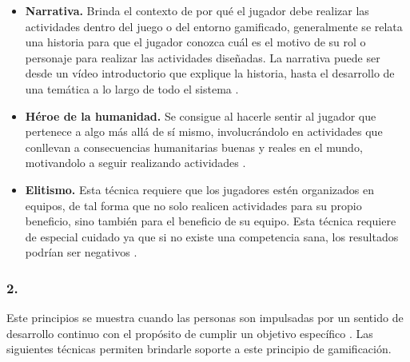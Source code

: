     \begin{itemize}
    \item
    {\bf Narrativa.}
        Brinda el contexto de por qué el jugador debe realizar las actividades dentro del juego o
        del entorno gamificado, generalmente se relata una historia para que el jugador conozca
        cuál es el motivo de su rol o personaje para realizar las actividades diseñadas.
        La narrativa puede ser desde un vídeo introductorio que explique la historia, hasta
        el desarrollo de una temática a lo largo de todo el sistema \cite[p. 81]{Octalysis}.

    \item
    {\bf Héroe de la humanidad.}
        Se consigue al hacerle sentir al jugador que pertenece a algo más allá de sí mismo,
        involucrándolo en actividades que conllevan a consecuencias humanitarias buenas y reales
        en el mundo, motivandolo a seguir realizando actividades \cite[p. 82]{Octalysis}.

    \item
    {\bf Elitismo.}
        Esta técnica requiere que los jugadores estén organizados en equipos, de tal forma que
        no solo realicen actividades para su propio beneficio, sino también para el beneficio
        de su equipo. Esta técnica requiere de especial cuidado ya que si no existe una competencia
        sana, los resultados podrían ser negativos \cite[p. 83]{Octalysis}.

    \end{itemize}

\subsubsection{2. \principioII} \label{subsec:principioII}

 Este principios se muestra cuando las personas son impulsadas por un sentido de desarrollo continuo
 con el propósito de cumplir un objetivo específico \cite[p. 91]{Octalysis}. Las siguientes técnicas
 permiten brindarle soporte a este principio de gamificación.

